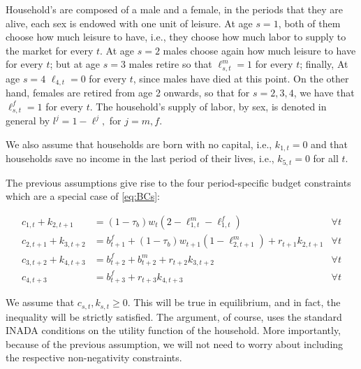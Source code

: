 \documentclass[BufferStockTheory]{subfiles}
\begin{document}
Household's are composed of a male and a female, in the periods that they are alive, each sex is endowed with one unit of leisure. At age $s=1$, both of them choose how much leisure to have, i.e., they choose how much labor to supply to the market for every $t$. At age $s=2$ males choose again how much leisure to have for every $t$; but at age $s=3$ males retire so that  $\ell_{s,t}^m=1$ for every $t$; finally,  At age $s=4$ $\ell_{4,t}=0$ for every $t$, since males have died at this point. On the other hand, females are retired from age 2 onwards, so that for $s=2,3,4$, we have that $\ell_{s,t}^f=1$ for every $t.$ The household's supply of labor, by sex, is denoted in general by $l^j=1-\ell^j,$ for $j=m,f.$

 We also assume that households are born with no capital, i.e., $k_{1,t}=0$ and that households save no income in the last period of their lives, i.e., $k_{5,t}=0$ for all $t.$

 The previous assumptions give rise to the four period-specific budget constraints which are a special case of \eqref{eq:BCs}:

  \begin{subequations}
 \label{eq:BCsimplified}
 	 \begin{align}
 	c_{1,t} + k_{2,t+1} &= (1-\tau_b)w_t (2-\ell_{1,t}^m - \ell_{1,t}^f) & \forall t \\
 	c_{2,t+1} + k_{3,t+2} &= b_{t+1}^f+(1-\tau_b)w_{t+1} (1-\ell_{2,t+1}^m ) + r_{t+1}k_{2,t+1} & \forall t \\
 	c_{3,t+2} + k_{4,t+3} &= b_{t+2}^f+ b_{t+2}^m  + r_{t+2}k_{3,t+2} & \forall t \\
 	c_{4,t+3}  &= b_{t+3}^f + r_{t+3}k_{4,t+3} & \forall t
 \end{align}
 \end{subequations}
 
 We assume that $c_{s,t},k_{s,t}\geq 0.$ This will be true in equilibrium, and in fact, the inequality will be strictly satisfied. The argument, of course, uses the standard INADA conditions on the utility function of the household. More importantly, because of the previous assumption, we will not need to worry about including the respective non-negativity constraints. 
\end{document}
